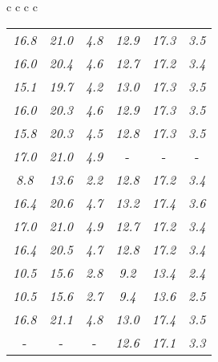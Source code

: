 \documentclass[sigplan,screen]{acmart}
\makeatletter
\newcommand{\ccell}[3][]{%
  \kern-\fboxsep
  \if\relax\detokenize{#1}\relax
    \expandafter\@firstoftwo
  \else
    \expandafter\@secondoftwo
  \fi
  {\colorbox{#2}}%
  {\colorbox[#1]{#2}}%
  {#3}\kern-\fboxsep
}
\makeatother
\begin{document}
\begin{table*}
\begin{tabular}{c c c c}
\begin{tabular}{c c c c c c}
      
      \textit{16.8} & \textit{21.0} & \textit{4.8} & \textit{12.9} & \textit{17.3} & \textit{3.5} \\
      \textit{16.0} & \textit{20.4} & \textit{4.6} & \textit{12.7} & \textit{17.2} & \textit{3.4} \\
      \textit{15.1} & \textit{19.7} & \textit{4.2} & \textit{13.0} & \textit{17.3} & \textit{3.5} \\
      \textit{16.0} & \textit{20.3} & \textit{4.6} & \textit{12.9} & \textit{17.3} & \textit{3.5} \\
      \textit{15.8} & \textit{20.3} & \textit{4.5} & \textit{12.8} & \textit{17.3} & \textit{3.5} \\
      \textit{17.0} & \textit{21.0} & \textit{4.9} &  \ccell[gray]{0.9}{\textit{13.6}} &  \ccell[gray]{0.9}{\textit{17.6}} &  \ccell[gray]{0.9}{\textit{3.7}} \\
      \textit{8.8} & \textit{13.6} & \textit{2.2} & \textit{12.8} & \textit{17.2} & \textit{3.4} \\
      \textit{16.4} & \textit{20.6} & \textit{4.7} & \textit{13.2} & \textit{17.4} & \textit{3.6} \\
      \textit{17.0} & \textit{21.0} & \textit{4.9} & \textit{12.7} & \textit{17.2} & \textit{3.4} \\
      \textit{16.4} & \textit{20.5} & \textit{4.7} & \textit{12.8} & \textit{17.2} & \textit{3.4} \\
      \textit{10.5} & \textit{15.6} & \textit{2.8} & \textit{9.2} & \textit{13.4} & \textit{2.4} \\
      \textit{10.5} & \textit{15.6} & \textit{2.7} & \textit{9.4} & \textit{13.6} & \textit{2.5} \\
      \textit{16.8} & \textit{21.1} & \textit{4.8} & \textit{13.0} & \textit{17.4} & \textit{3.5} \\
       \ccell[gray]{0.9}{\textit{17.2}} &  \ccell[gray]{0.9}{\textit{21.4}} &  \ccell[gray]{0.9}{\textit{5.0}} & \textit{12.6} & \textit{17.1} & \textit{3.3} \\
\end{tabular}
\\

    \end{tabular}
    
\bigskip

\end{table*}
    
\end{document}
